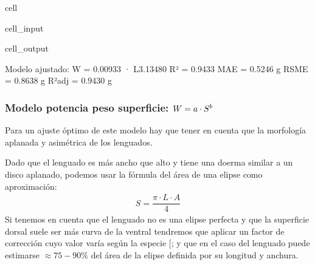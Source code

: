 \documentclass[a4paper,10pt,spanish]{jupyterBook}
\begin{document}
\begin{sphinxuseclass}{cell}
\begin{sphinxVerbatimInput}
\begin{sphinxuseclass}{cell_input}
\end{sphinxuseclass}\end{sphinxVerbatimInput}
\begin{sphinxVerbatimOutput}

\begin{sphinxuseclass}{cell_output}
\noindent{}

\begin{sphinxVerbatim}[commandchars=\\\{\}]
Modelo ajustado: W = 0.00933 · L\PYGZca{}3.13480
R² = 0.9433
MAE = 0.5246 g
RSME = 0.8638 g
R²adj = 0.9430 g
\end{sphinxVerbatim}

\end{sphinxuseclass}\end{sphinxVerbatimOutput}

\end{sphinxuseclass}

\subsubsection{Modelo potencia peso \sphinxhyphen{} superficie: \protect\(W=a\cdot S^b\protect\)}
\label{\detokenize{content/03/Coeficientes:modelo-potencia-peso-superficie-w-a-cdot-s-b}}
\sphinxAtStartPar
Para un ajuste óptimo de este modelo hay que tener en cuenta que la morfología aplanada y asimétrica de los lenguados.

\sphinxAtStartPar
Dado que el lenguado es más ancho que alto y tiene una doerma similar a un disco aplanado, podemos usar la fórmula del área de una elipse como aproximación:
\begin{equation*}
\begin{split}S=\dfrac{\pi \cdot L \cdot A}{4}\end{split}
\end{equation*}
\sphinxAtStartPar
Si tenemos en cuenta que el lenguado no es una elipse perfecta y que la superficie dorsal suele ser más curva de la ventral tendremos que aplicar un factor de corrección cuyo valor varía según la especie {[}; \sphinxhref{https://doi.org/10.5370/JEET.2013.8.5.1194}{Jeong et al., 2013}{]} y que en el caso del lenguado puede estimarse \(\approx 75-90 \%\) del área de la elipse definida por su longitud y anchura.
\end{document}
